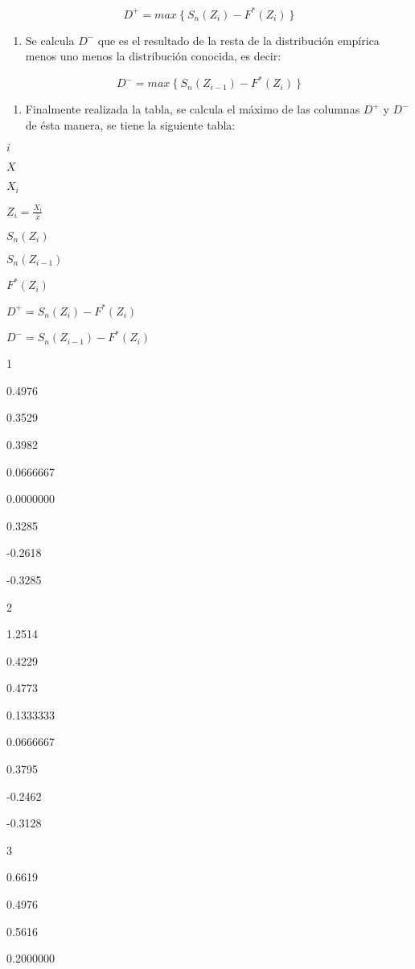 \documentclass[
  a4paper,
  oneside,
  openany]{book}
\providecommand{\tightlist}{%
  \setlength{\itemsep}{0pt}\setlength{\parskip}{0pt}}
\begin{document}
\[D^+= max \ \{ \ S_{n}(Z_{i})-F^*(Z_{i}) \ \}\]

\begin{enumerate}
\def\labelenumi{\arabic{enumi})}
\setcounter{enumi}{6}
\tightlist
\item
  Se calcula \(D^-\) que es el resultado de la resta de la distribución empírica menos uno menos la distribución conocida, es decir:
\end{enumerate}

\[D^-= max \  \{\ S_{n}(Z_{i-1})-F^*(Z_{i}) \ \}\]

\begin{enumerate}
\def\labelenumi{\arabic{enumi})}
\setcounter{enumi}{7}
\tightlist
\item
  Finalmente realizada la tabla, se calcula el máximo de las columnas \(D^+\) y \(D^-\) de ésta manera, se tiene la siguiente tabla:
\end{enumerate}

\(i\)

\(X\)

\(X_i\)

\(Z_i=\frac{X_i}{\bar{x}}\)

\(S_n(Z_i)\)

\(S_n(Z_{i-1})\)

\(F^*(Z_i)\)

\(D^+=S_n(Z_i)-F^*(Z_i)\)

\(D^-=S_n(Z_{i-1})-F^*(Z_i)\)

1

0.4976

0.3529

0.3982

0.0666667

0.0000000

0.3285

-0.2618

-0.3285

2

1.2514

0.4229

0.4773

0.1333333

0.0666667

0.3795

-0.2462

-0.3128

3

0.6619

0.4976

0.5616

0.2000000
\end{document}
